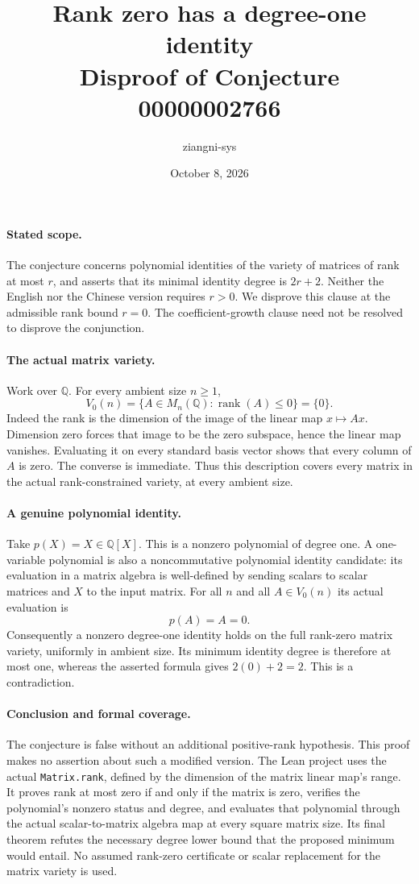 \documentclass[11pt]{article}
\title{Rank zero has a degree-one identity\\Disproof of Conjecture 00000002766}
\author{ziangni-sys}
\date{October 8, 2026}
\begin{document}
\maketitle
\paragraph{Stated scope.}
The conjecture concerns polynomial identities of the variety of
matrices of rank at most $r$, and asserts that its minimal identity
degree is $2r+2$. Neither the English nor the Chinese version requires
$r>0$. We disprove this clause at the admissible rank bound $r=0$.
The coefficient-growth clause need not be resolved to disprove the
conjunction.

\paragraph{The actual matrix variety.}
Work over $\mathbb Q$. For every ambient size $n\geq1$,
\[
 V_0(n)=\{A\in M_n(\mathbb Q):\operatorname{rank}(A)\leq0\}
       =\{0\}.
\]
Indeed the rank is the dimension of the image of the linear map
$x\mapsto Ax$. Dimension zero forces that image to be the zero
subspace, hence the linear map vanishes. Evaluating it on every
standard basis vector shows that every column of $A$ is zero.
The converse is immediate. Thus this description covers every
matrix in the actual rank-constrained variety, at every ambient size.

\paragraph{A genuine polynomial identity.}
Take $p(X)=X\in\mathbb Q[X]$. This is a nonzero polynomial of degree
one. A one-variable polynomial is also a noncommutative polynomial
identity candidate: its evaluation in a matrix algebra is well-defined
by sending scalars to scalar matrices and $X$ to the input matrix.
For all $n$ and all $A\in V_0(n)$ its actual evaluation is
\[
 p(A)=A=0.
\]
Consequently a nonzero degree-one identity holds on the full rank-zero
matrix variety, uniformly in ambient size. Its minimum identity degree
is therefore at most one, whereas the asserted formula gives
$2(0)+2=2$. This is a contradiction.

\paragraph{Conclusion and formal coverage.}
The conjecture is false without an additional positive-rank hypothesis.
This proof makes no assertion about such a modified version.
The Lean project uses the actual \texttt{Matrix.rank}, defined by the
dimension of the matrix linear map's range. It proves rank at most zero
if and only if the matrix is zero, verifies the polynomial's nonzero
status and degree, and evaluates that polynomial through the actual
scalar-to-matrix algebra map at every square matrix size. Its final
theorem refutes the necessary degree lower bound that the proposed
minimum would entail. No assumed rank-zero certificate or scalar
replacement for the matrix variety is used.
\end{document}
